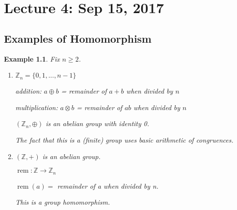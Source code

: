 \documentclass[11pt, oneside]{book}
\theoremstyle{break}
\newtheorem{eg}{Example}[section]
\newcommand{\bb}[1]{\mathbb{#1}}			%
\DeclareMathOperator{\rem}{rem}
\begin{document}
\chapter{Lecture 4: Sep 15, 2017}\label{lec4}

\section{Examples of Homomorphism}\label{eg_homomorphism}

\begin{eg}
    Fix $n \geq 2$.
    \begin{enumerate}
        \item $\bb{Z}_n = \{0, 1, ..., n - 1\}$

            addition: $a \oplus b$ = remainder of $a + b$ when divided by $n$

            multiplication: $a \otimes b$ = remainder of $ab$ when divided by $n$

            $(\bb{Z}_n , \oplus)$ is an abelian group with identity 0.

            The fact that this is a (finite) group uses basic arithmetic of congruences.

        \item $(\bb{Z} , +)$ is an abelian group.

            $\rem : \bb{Z} \to \bb{Z}_n$

            $\rem(a) = $ remainder of a when divided by n.

            This is a group homomorphism.
    \end{enumerate}
    
\end{eg}
\end{document}
